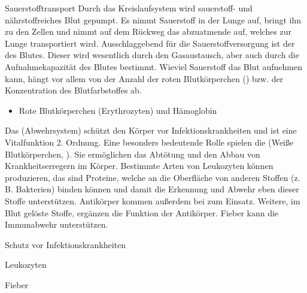 \TextSlide
{Sauerstofftransport}
{%
\label{topic:blut-sauerstofftransport}%
Durch das Kreislaufsystem wird sauerstoff- und
nährstoffreiches Blut gepumpt. 
Es nimmt Sauerstoff in der Lunge auf, bringt
ihn zu den Zellen und nimmt auf dem Rückweg das abzuatmende
 auf, welches zur Lunge transportiert wird. 
Ausschlaggebend für die
Sauerstoffversorgung ist der  des
Blutes. Dieser wird wesentlich durch den Gasaustausch, aber
auch durch die Aufnahmekapazität des Blutes bestimmt.
Wieviel Sauerstoff das Blut aufnehmen kann, hängt vor allem
von der Anzahl der roten Blutkörperchen ()
bzw. der Konzentration des Blutfarbstoffes 
ab. 
}
{
\begin{itemize}
  \item Rote Blutkörperchen (Erythrozyten) und Hämoglobin
\end{itemize}
}
{}
{}
{}




{%
%
\label{topic:immunsystem}%
\label{topic:vitalfunktion-immunsystem}%
%
Das  (Abwehrsystem) schützt den Körper vor
Infektionskrankheiten 
und ist eine Vitalfunktion 2. Ordnung. 
%
Eine besonders bedeutende Rolle
spielen die  
(Weiße Blutkörperchen, ). 
%
Sie ermöglichen das Abtötung
und den Abbau von Krankheitserregern im Körper. 
%
Bestimmte Arten von Leukozyten können 
  
produzieren, 
das sind Proteine, 
welche an die Oberfläche von anderen Stoffen (z.\,B. Bakterien) binden können
und damit die Erkennung 
und Abwehr eben dieser Stoffe unterstützen. 
%
Antikörper kommen außerdem bei  zum Einsatz.
Weitere, im Blut gelöste Stoffe, ergänzen die Funktion der Antikörper.
%
Fieber kann die Immunabwehr unterstützen.


}{
\begin{compactitem}
  \item Schutz vor Infektionskrankheiten
  \item Leukozyten
  \item Fieber  
\end{compactitem}
}{}{}{}





